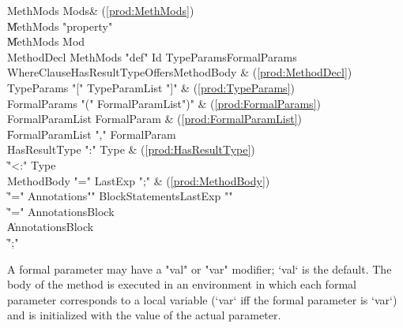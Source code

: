 \begin{bbgrammar}
 MethMods    \: Mods\opt & (\ref{prod:MethMods})\\%
    \| MethMods \xcd"property" \\
    \| MethMods Mod\\
 MethodDecl    \: MethMods \xcd"def" Id TypeParams\opt FormalParams WhereClause\opt HasResultType\opt Offers\opt MethodBody & (\ref{prod:MethodDecl})\\%
 TypeParams    \: \xcd"[" TypeParamList \xcd"]" & (\ref{prod:TypeParams})\\%
 FormalParams    \: \xcd"(" FormalParamList\opt \xcd")" & (\ref{prod:FormalParams})\\%
 FormalParamList    \: FormalParam & (\ref{prod:FormalParamList})\\%
    \| FormalParamList \xcd"," FormalParam\\
 HasResultType    \: \xcd":" Type & (\ref{prod:HasResultType})\\%
    \| \xcd"<:" Type\\
 MethodBody    \: \xcd"=" LastExp \xcd";" & (\ref{prod:MethodBody})\\%
    \| \xcd"=" Annotations\opt \xcd"{" BlockStatements\opt LastExp \xcd"}"\\
    \| \xcd"=" Annotations\opt Block\\
    \| Annotations\opt Block\\
    \| \xcd";"\\
\end{bbgrammar}



A formal parameter may have a \xcd"val" or \xcd"var"
modifier; \xcd`val` is the default.
The body of the method is executed in an environment in which 
each formal parameter corresponds to a local variable (\xcd`var` iff the
formal parameter is \xcd`var`)
and is initialized with the value of the actual parameter.

